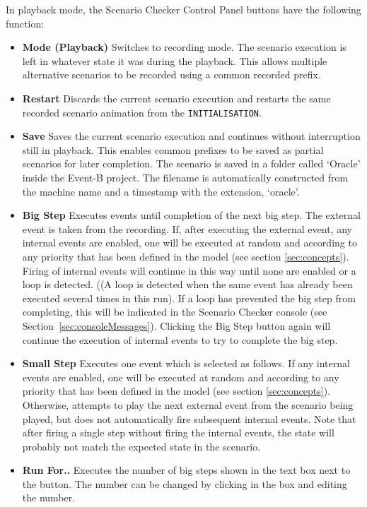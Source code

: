 In playback mode, the Scenario Checker Control Panel buttons have the following function:
\begin{itemize}
	\item \textbf{Mode (Playback)}  Switches to recording mode. The scenario execution is left in whatever state it was during the playback. This allows multiple alternative scenarios to be recorded using a common recorded prefix.
	\item \textbf{Restart}  Discards the current scenario execution and restarts the same recorded scenario animation from the \texttt{INITIALISATION}. 
	\item \textbf{Save}  Saves the current scenario execution and continues without interruption still in playback. This enables common prefixes to be saved as partial scenarios for later completion. The scenario is saved in a folder called `Oracle' inside the Event-B project. The filename is automatically constructed from the machine name and a timestamp with the extension, `oracle'. 
	\item \textbf{Big Step}  Executes events until completion of the next big step. The external event is taken from the recording. If, after executing the external event, any internal events are enabled, one will be executed at random and according to any priority that has been defined in the model (see section \ref{sec:concepts}). Firing of internal events will continue in this way until none are enabled or a loop is detected. ((A loop is detected when the same event has already been executed several times in this run). If a loop has prevented the big step from completing, this will be indicated in the Scenario Checker console (see Section~\ref{sec:consoleMessages}). Clicking the Big Step button again will continue the execution of internal events to try to complete the big step.
	\item \textbf{Small Step}   Executes one event which is selected as follows. If any internal events are enabled, one will be executed at random and according to any priority that has been defined in the model (see section \ref{sec:concepts}). Otherwise, attempts to play the next external event from the scenario being played, but does not automatically fire subsequent internal events. Note that after firing a single step without firing the internal events, the state will probably not match the expected state in the scenario.
	\item \textbf{Run For..}   Executes the number of big steps shown in the text box next to the button. The number can be changed by clicking in the box and editing the number.
\end{itemize}

